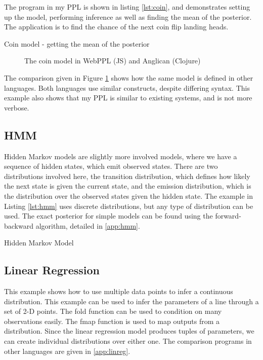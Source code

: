 The program in my PPL is shown in listing \ref{lst:coin}, and demonstrates setting up the model, performing inference as well as finding the mean of the posterior. The application is to find the chance of the next coin flip landing heads.

\begin{listing}[!ht]
	\caption{Coin model - getting the mean of the posterior}
	\label{lst:coin}
\end{listing}


\begin{figure}[!htb]
	\begin{minipage}{0.5\textwidth}
		\centering
	\end{minipage}
	\begin{minipage}{0.5\textwidth}
		\centering
	\end{minipage}
	\caption{The coin model in WebPPL (JS) and Anglican (Clojure)}
	\label{fig:compare-coin}
\end{figure}

The comparison given in Figure \ref{fig:compare-coin} shows how the same model is defined in other languages. Both languages use similar constructs, despite differing syntax. This example also shows that my PPL is similar to existing systems, and is not more verbose.

\subsection{HMM}
Hidden Markov models are slightly more involved models, where we have a sequence of hidden states, which emit observed states. There are two distributions involved here, the transition distribution, which defines how likely the next state is given the current state, and the emission distribution, which is the distribution over the observed states given the hidden state. The example in Listing \ref{lst:hmm} uses discrete distributions, but any type of distribution can be used. The exact posterior for simple models can be found using the forward-backward algorithm, detailed in \ref{app:hmm}.
\begin{listing}[!ht]
	\caption{Hidden Markov Model}
	\label{lst:hmm}
\end{listing}

\subsection{Linear Regression}
This example shows how to use multiple data points to infer a continuous distribution. This example can be used to infer the parameters of a line through a set of 2-D points. The fold function can be used to condition on many observations easily. The fmap function is used to map outputs from a distribution. Since the linear regression model produces tuples of parameters, we can create individual distributions over either one. The comparison programs in other languages are given in \ref{app:linreg}.

